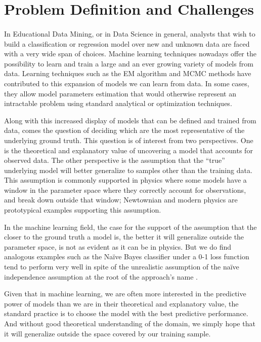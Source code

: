 \label{sec:Introduction} 

\section{Problem Definition and Challenges}
\paragraph{}

In Educational Data Mining, or in Data Science in general, analysts that wish to build a classification or regression model over new and unknown data are faced with a very wide span of choices. Machine learning techniques nowadays offer the possibility to learn and train a large and an ever growing variety of models from data. Learning techniques such as the EM algorithm and MCMC methods have contributed to this expansion of models we can learn from data. In some cases, they allow model parameters estimation that would otherwise represent an intractable problem using standard analytical or optimization techniques.

Along with this increased display of models that can be defined and trained from data, comes the question of deciding which are the most representative of the underlying ground truth. This question is of interest from two perspectives. One is the theoretical and explanatory value of uncovering a model that accounts for observed data. The other perspective is the assumption that the ``true'' underlying model will better generalize to samples other than the training data. This assumption is commonly supported in physics where some models have a window in the parameter space where they correctly account for observations, and break down outside that window; Newtownian and modern physics are prototypical examples supporting this assumption. 

In the machine learning field, the case for the support of the assumption that the closer to the ground truth a model is, the better it will generalize outside the parameter space, is not as evident as it can be in physics. But we do find analogous examples such as the Naïve Bayes classifier under a 0-1 loss function tend to perform very well in spite of the unrealistic assumption of the naïve independence assumption at the root of the approach's name \citep{domingos1997}.

Given that in machine learning, we are often more interested in the predictive power of models than we are in their theoretical and explanatory value, the standard practice is to choose the model with the best predictive performance. And without good theoretical understanding of the domain, we simply hope that it will generalize outside the space covered by our training sample. 

